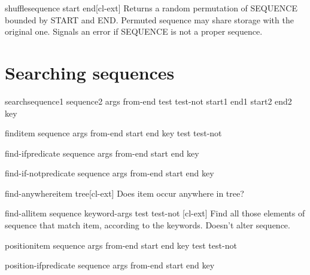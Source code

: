 \documentclass[10pt,english]{book}
\begin{document}
\begin{function}{shuffle}{sequence \key start end}[cl-ext]
  Returns a random permutation of SEQUENCE bounded by START and END.
  Permuted sequence may share storage with the original one. Signals
  an error if SEQUENCE is not a proper sequence.
\end{function}

\section{Searching sequences}
\label{sec:searching-sequences}

\begin{function}{search}{sequence1 sequence2 \rest args \key from-end test test-not start1 end1 start2
    end2 key}
  
\end{function}

\begin{function}{find}{item sequence \rest args \key from-end start end key test test-not}
  
\end{function}

\begin{function}{find-if}{predicate sequence \rest args \key from-end start end key}
  
\end{function}

\begin{function}{find-if-not}{predicate sequence \rest args \key from-end start end key}
  
\end{function}

\begin{function}{find-anywhere}{item tree}[cl-ext]
  Does item occur anywhere in tree?
\end{function}

\begin{function}{find-all}{item sequence \rest keyword-args \key test test-not \akeys}[cl-ext]
  Find all those elements of sequence that match item, according to
  the keywords. Doesn't alter sequence.
\end{function}

\begin{function}{position}{item sequence \rest args \key from-end start end key test test-not}
  
\end{function}

\begin{function}{position-if}{predicate sequence \rest args \key from-end start end key}
  
\end{function}
\end{document}

